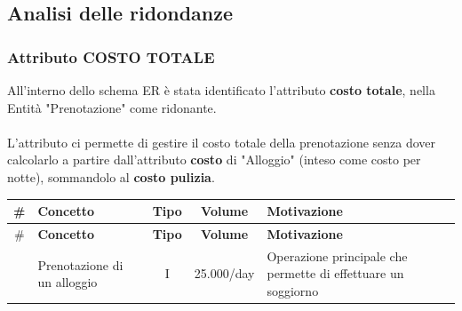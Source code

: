 \subsection{Analisi delle ridondanze}
\subsubsection{Attributo COSTO TOTALE}
All'interno dello schema ER è stata identificato l'attributo \textbf{costo totale}, nella Entità "Prenotazione" come ridonante.\\\\
L'attributo ci permette di gestire il costo totale della prenotazione senza dover calcolarlo a partire dall'attributo \textbf{costo} di "Alloggio" (inteso come costo per notte), sommandolo al \textbf{costo pulizia}.

\small
\setlength\extrarowheight{2pt}
\begin{longtable}{|c|p{3cm}|c|c|p{4.18cm}|}
      \hline \# & \textbf{Concetto}           & \textbf{Tipo} & \textbf{Volume} & \textbf{Motivazione}                                          \\\hline
      \endfirsthead

      \hline \# & \textbf{Concetto}           & \textbf{Tipo} & \textbf{Volume} & \textbf{Motivazione}                                          \\\hline
      \endhead

      \endfoot

      \endlastfoot
      2         & Prenotazione di un alloggio & {I}           & 25.000/day      & Operazione principale che permette di effettuare un soggiorno \\\hline
\end{longtable}
\normalsize

